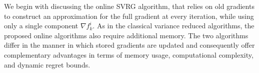 \documentclass[draftcls,onecolumn,12pt]{IEEEtran}
\theoremstyle{plain}
\def\x{\mathbf{x}}
\providecommand{\norm}[1]{\left\|#1\right\|}
\theoremstyle{plain}
\theoremstyle{remark}
\begin{document}

We begin with discussing the online SVRG algorithm, that relies on old gradients to construct an approximation for the full gradient at every iteration, while using only a single component $\nabla f_k^i$. As in the classical variance reduced algorithms, the proposed online algorithms also require additional memory. The two algorithms differ in the manner in which stored gradients are updated and consequently offer complementary advantages in terms of memory usage, computational complexity, and dynamic regret bounds. 
\end{document}
